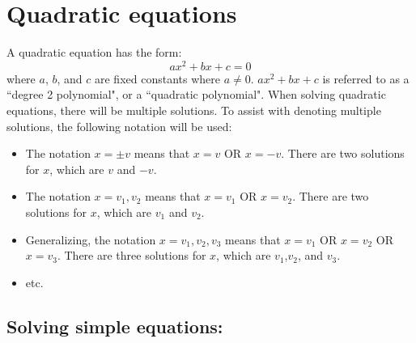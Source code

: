\documentclass{article}
\begin{document}
\section*{Quadratic equations} 

A quadratic equation has the form:
\[ax^2 + bx + c = 0\]
where \(a\), \(b\), and \(c\) are fixed constants where \(a \neq 0\). \(ax^2 + bx + c\) is referred to as a ``degree 2 polynomial", or a ``quadratic polynomial". When solving quadratic equations, there will be multiple solutions. To assist with denoting multiple solutions, the following notation will be used:

\begin{itemize}
\item The notation \(x = \pm v\) means that \(x = v\) OR \(x = -v\). There are two solutions for \(x\), which are \(v\) and \(-v\).
\item The notation \(x = v_1, v_2\) means that \(x = v_1\) OR \(x = v_2\). There are two solutions for \(x\), which are \(v_1\) and \(v_2\). 
\item Generalizing, the notation \(x = v_1, v_2, v_3\) means that \(x = v_1\) OR \(x = v_2\) OR \(x = v_3\). There are three solutions for \(x\), which are \(v_1\),\(v_2\), and \(v_3\). 
\item etc.
\end{itemize}



\subsection*{Solving simple equations:}
\end{document}

